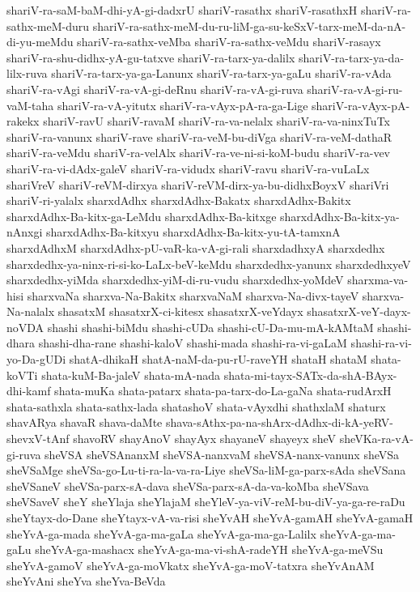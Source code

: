 {shariV-ra-saM-baM-dhi-yA-gi-dadxrU
shariV-rasathx
shariV-rasathxH
shariV-ra-sathx-meM-duru
shariV-ra-sathx-meM-du-ru-liM-ga-su-keSxV-tarx-meM-da-nA-di-yu-meMdu
shariV-ra-sathx-veMba
shariV-ra-sathx-veMdu
shariV-rasayx
shariV-ra-shu-didhx-yA-gu-tatxve
shariV-ra-tarx-ya-dalilx
shariV-ra-tarx-ya-da-lilx-ruva
shariV-ra-tarx-ya-ga-Lanunx
shariV-ra-tarx-ya-gaLu
shariV-ra-vAda
shariV-ra-vAgi
shariV-ra-vA-gi-deRnu
shariV-ra-vA-gi-ruva
shariV-ra-vA-gi-ru-vaM-taha
shariV-ra-vA-yitutx
shariV-ra-vAyx-pA-ra-ga-Lige
shariV-ra-vAyx-pA-rakekx
shariV-ravU
shariV-ravaM
shariV-ra-va-nelalx
shariV-ra-va-ninxTuTx
shariV-ra-vanunx
shariV-rave
shariV-ra-veM-bu-diVga
shariV-ra-veM-dathaR
shariV-ra-veMdu
shariV-ra-velAlx
shariV-ra-ve-ni-si-koM-budu
shariV-ra-vev
shariV-ra-vi-dAdx-galeV
shariV-ra-vidudx
shariV-ravu
shariV-ra-vuLaLx
shariVreV
shariV-reVM-dirxya
shariV-reVM-dirx-ya-bu-didhxBoyxV
shariVri
shariV-ri-yalalx
sharxdAdhx
sharxdAdhx-Bakatx
sharxdAdhx-Bakitx
sharxdAdhx-Ba-kitx-ga-LeMdu
sharxdAdhx-Ba-kitxge
sharxdAdhx-Ba-kitx-ya-nAnxgi
sharxdAdhx-Ba-kitxyu
sharxdAdhx-Ba-kitx-yu-tA-tamxnA
sharxdAdhxM
sharxdAdhx-pU-vaR-ka-vA-gi-rali
sharxdadhxyA
sharxdedhx
sharxdedhx-ya-ninx-ri-si-ko-LaLx-beV-keMdu
sharxdedhx-yanunx
sharxdedhxyeV
sharxdedhx-yiMda
sharxdedhx-yiM-di-ru-vudu
sharxdedhx-yoMdeV
sharxma-va-hisi
sharxvaNa
sharxva-Na-Bakitx
sharxvaNaM
sharxva-Na-divx-tayeV
sharxva-Na-nalalx
shasatxM
shasatxrX-ci-kitesx
shasatxrX-veYdayx
shasatxrX-veY-dayx-noVDA
shashi
shashi-biMdu
shashi-cUDa
shashi-cU-Da-mu-mA-kAMtaM
shashi-dhara
shashi-dha-rane
shashi-kaloV
shashi-mada
shashi-ra-vi-gaLaM
shashi-ra-vi-yo-Da-gUDi
shatA-dhikaH
shatA-naM-da-pu-rU-raveYH
shataH
shataM
shata-koVTi
shata-kuM-Ba-jaleV
shata-mA-nada
shata-mi-tayx-SATx-da-shA-BAyx-dhi-kamf
shata-muKa
shata-patarx
shata-pa-tarx-do-La-gaNa
shata-rudArxH
shata-sathxla
shata-sathx-lada
shatashoV
shata-vAyxdhi
shathxlaM
shaturx
shavARya
shavaR
shava-daMte
shava-sAthx-pa-na-shArx-dAdhx-di-kA-yeRV-shevxV-tAnf
shavoRV
shayAnoV
shayAyx
shayaneV
shayeyx
sheV
sheVKa-ra-vA-gi-ruva
sheVSA
sheVSAnanxM
sheVSA-nanxvaM
sheVSA-nanx-vanunx
sheVSa
sheVSaMge
sheVSa-go-Lu-ti-ra-la-va-ra-Liye
sheVSa-liM-ga-parx-sAda
sheVSana
sheVSaneV
sheVSa-parx-sA-dava
sheVSa-parx-sA-da-va-koMba
sheVSava
sheVSaveV
sheY
sheYlaja
sheYlajaM
sheYleV-ya-viV-reM-bu-diV-ya-ga-re-raDu
sheYtayx-do-Dane
sheYtayx-vA-va-risi
sheYvAH
sheYvA-gamAH
sheYvA-gamaH
sheYvA-ga-mada
sheYvA-ga-ma-gaLa
sheYvA-ga-ma-ga-Lalilx
sheYvA-ga-ma-gaLu
sheYvA-ga-mashacx
sheYvA-ga-ma-vi-shA-radeYH
sheYvA-ga-meVSu
sheYvA-gamoV
sheYvA-ga-moVkatx
sheYvA-ga-moV-tatxra
sheYvAnAM
sheYvAni
sheYva
sheYva-BeVda
}
